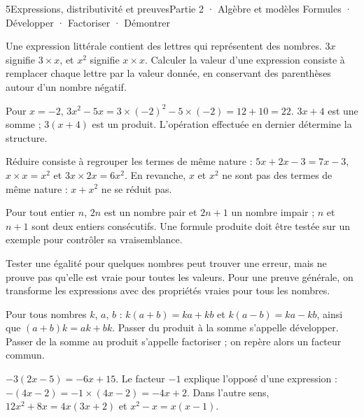 \begin{ouverture}[calcul]{5}{Expressions, distributivité et preuves}{Partie 2 · Algèbre et modèles}
{Formules · Développer · Factoriser · Démontrer}
\end{ouverture}
\pagestyle{otMain}\essentiel\fontsize{11}{15}\selectfont
{}\label{cours-5-1}
\begin{definition}Une expression littérale contient des lettres qui représentent des nombres. $3x$ signifie $3\times x$, et $x^2$ signifie $x\times x$. Calculer la valeur d’une expression consiste à remplacer chaque lettre par la valeur donnée, en conservant des parenthèses autour d’un nombre négatif.\end{definition}
\begin{exemple}Pour $x=-2$, $3x^2-5x=3\times(-2)^2-5\times(-2)=12+10=22$. $3x+4$ est une somme ; $3(x+4)$ est un produit. L’opération effectuée en dernier détermine la structure.\end{exemple}
\begin{propriete}Réduire consiste à regrouper les termes de même nature : $5x+2x-3=7x-3$, $x\times x=x^2$ et $3x\times2x=6x^2$. En revanche, $x$ et $x^2$ ne sont pas des termes de même nature : $x+x^2$ ne se réduit pas.\end{propriete}
\begin{definition}Pour tout entier $n$, $2n$ est un nombre pair et $2n+1$ un nombre impair ; $n$ et $n+1$ sont deux entiers consécutifs. Une formule produite doit être testée sur un exemple pour contrôler sa vraisemblance.\end{definition}
\begin{attention}Tester une égalité pour quelques nombres peut trouver une erreur, mais ne prouve pas qu’elle est vraie pour toutes les valeurs. Pour une preuve générale, on transforme les expressions avec des propriétés vraies pour tous les nombres.\end{attention}
\clearpage
{}\label{cours-5-2}
\begin{propriete}Pour tous nombres $k$, $a$, $b$ : $k(a+b)=ka+kb$ et $k(a-b)=ka-kb$, ainsi que $(a+b)k=ak+bk$. Passer du produit à la somme s’appelle développer. Passer de la somme au produit s’appelle factoriser ; on repère alors un facteur commun.\end{propriete}
\begin{exemple}$-3(2x-5)=-6x+15$. Le facteur $-1$ explique l’opposé d’une expression : $-(4x-2)=-1\times(4x-2)=-4x+2$. Dans l’autre sens, $12x^2+8x=4x(3x+2)$ et $x^2-x=x(x-1)$.\end{exemple}
\label{fig-cours-5-2-cours-distributivite}

